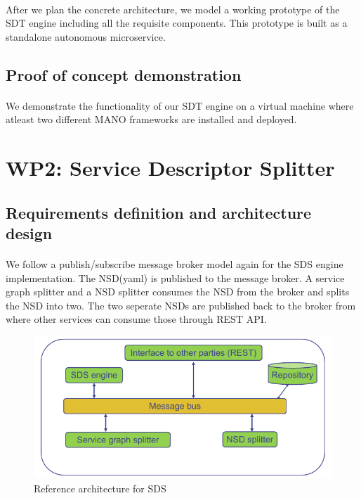 \paragraph{}
After we plan the concrete architecture, we model a working prototype of the SDT engine including all the requisite components. This prototype is built as a standalone autonomous microservice.
\subsection{Proof of concept demonstration}
\paragraph{}
We demonstrate the functionality of our SDT engine on a virtual machine where atleast two different MANO frameworks are installed and deployed. 

\section{WP2: Service Descriptor Splitter}

\subsection{Requirements definition and architecture design}
\paragraph{}
We follow a publish/subscribe message broker model again for the SDS engine implementation. The NSD(yaml) is published to the message broker. A service graph splitter and a NSD splitter consumes the NSD from the broker and splits the NSD into two. The two seperate NSDs are published back to the broker from where other services can consume those through REST API.
\begin{figure}[h]
	\centering
	\includegraphics[width=0.9\linewidth]{figures/wp2Arch}
	\caption{Reference architecture for SDS}
	\label{fig:wp2arch}
\end{figure}

